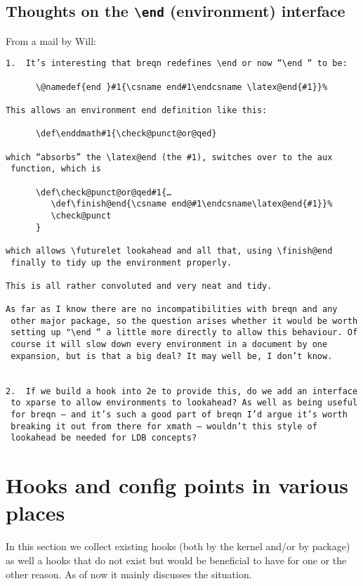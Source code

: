 \documentclass{article}
\newcounter{hook}
\newcounter{config}
\newcommand\cs[1]{\texttt{\textbackslash #1}}
\begin{document}
\subsection{Thoughts on the \cs{end} (environment) interface}

From a mail by Will:
\begin{verbatim}
1.  It’s interesting that breqn redefines \end or now “\end “ to be:

      \@namedef{end }#1{\csname end#1\endcsname \latex@end{#1}}%

This allows an environment end definition like this:

      \def\enddmath#1{\check@punct@or@qed}

which “absorbs” the \latex@end (the #1), switches over to the aux
 function, which is

      \def\check@punct@or@qed#1{…
         \def\finish@end{\csname end@#1\endcsname\latex@end{#1}}%
         \check@punct
      }

which allows \futurelet lookahead and all that, using \finish@end
 finally to tidy up the environment properly.

This is all rather convoluted and very neat and tidy.

As far as I know there are no incompatibilities with breqn and any
 other major package, so the question arises whether it would be worth
 setting up "\end “ a little more directly to allow this behaviour. Of
 course it will slow down every environment in a document by one
 expansion, but is that a big deal? It may well be, I don’t know.


2.  If we build a hook into 2e to provide this, do we add an interface
 to xparse to allow environments to lookahead? As well as being useful
 for breqn — and it’s such a good part of breqn I’d argue it’s worth
 breaking it out from there for xmath — wouldn’t this style of
 lookahead be needed for LDB concepts?
\end{verbatim}


\section{Hooks and config points in various places}

In this section we collect existing \LaTeXe{} hooks (both by the
kernel and/or by package) as well a hooks that do not exist but would
be beneficial to have for one or the other reason. As of now it mainly
discusses the \LaTeXe{} situation.
\end{document}
